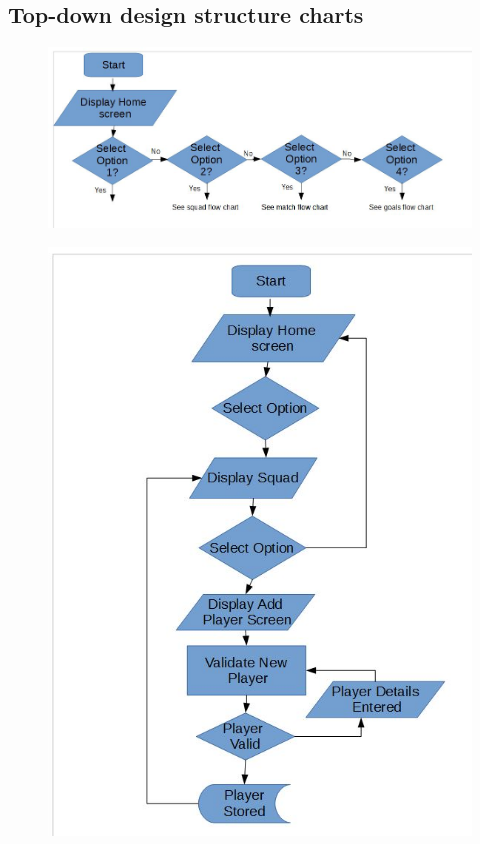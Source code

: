 \subsection{Top-down design structure charts}
\begin{figure}[H]
	\includegraphics[width=150mm]{mainFC}
\end{figure}
\begin{figure}[H]
	\includegraphics[width=150mm]{squadFc}
\end{figure}
